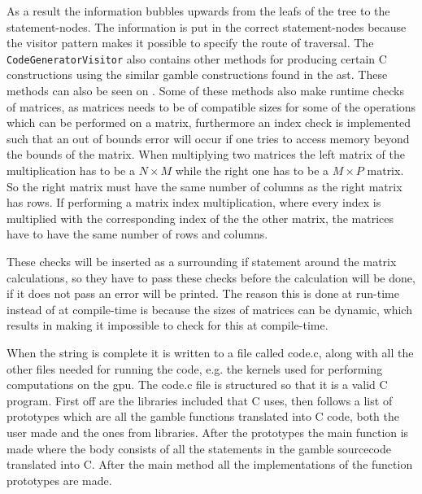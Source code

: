 As a result the information bubbles upwards from the leafs of the tree to the statement-nodes.
The information is put in the correct statement-nodes because the visitor pattern makes it possible to specify the route of traversal.
The \texttt{CodeGeneratorVisitor} also contains other methods for producing certain C constructions using the similar \gls{gamble} constructions found in the \acrshort{ast}.
These methods can also be seen on .
Some of these methods also make runtime checks of matrices, as matrices needs to be of compatible sizes for some of the operations which can be performed on a matrix, furthermore an index check is implemented such that an out of bounds error will occur if one tries to access memory beyond the bounds of the matrix.
When multiplying two matrices the left matrix of the multiplication has to be a $ N \times M $ while the right one has to be a $ M \times P $ matrix.
So the right matrix must have the same number of columns as the right matrix has rows.
If performing a matrix index multiplication, where every index is multiplied with the corresponding index of the the other matrix, the matrices have to have the same number of rows and columns. 

These checks will be inserted as a surrounding if statement around the matrix calculations, so they have to pass these checks before the calculation will be done, if it does not pass an error will be printed.
The reason this is done at run-time instead of at compile-time is because the sizes of matrices can be dynamic, which results in making it impossible to check for this at compile-time.

When the string is complete it is written to a file called code.c, along with all the other files needed for running the code, e.g. the kernels used for performing computations on the \acrshort{gpu}.
The code.c file is structured so that it is a valid C program.
First off are the libraries included that C uses, then follows a list of prototypes which are all the \gls{gamble} functions translated into C code, both the user made and the ones from libraries.
After the prototypes the main function is made where the body consists of all the statements in the \gls{gamble} sourcecode translated into C.
After the main method all the implementations of the function prototypes are made.
